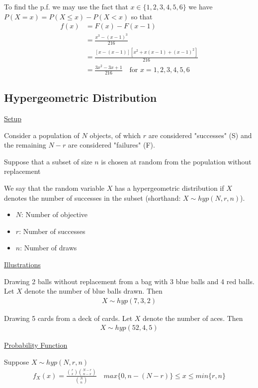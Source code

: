 \documentclass{article}
\begin{document}
To find the p.f. we may use the fact that $x \in \{1,2,3,4,5,6\}$ we have $P(X = x) = P(X \le x) - P(X < x)$ so that
\begin{align*}
    f(x) &= F(x) - F(x-1)\\
    &= \frac{x^3-(x-1)^3}{216}\\
    &=\frac{[x-(x-1)][x^2+x(x-1)+(x-1)^2]}{216}\\
    &=\frac{3x^2 - 3x + 1}{216} \quad \text{for } x = 1,2,3,4,5,6
\end{align*}

\subsection{Hypergeometric Distribution}

\underline{Setup}

Consider a population of $N$ objects, of which $r$ are considered "successes" (S) and the remaining $N-r$ are considered "failures" (F). 

Suppose that a subset of size $n$ is chosen at random from the population without replacement

We say that the random variable $X$ has a hypergeometric distribution if $X$ denotes the number of successes in the subset (shorthand: $X \sim hyp(N,r,n)$).
\begin{itemize}
    \item $N$: Number of objective
    \item $r$: Number of successes
    \item $n$: Number of draws
\end{itemize}

\underline{Illustrations}

Drawing 2 balls without replacement from a bag with 3 blue balls and 4 red balls. Let $X$ denote the number of blue balls drawn. Then
\begin{align*}
    X \sim hyp(7,3,2)
\end{align*}

Drawing 5 cards from a deck of cards. Let $X$ denote the number of aces. Then
\begin{align*}
    X \sim hyp(52,4,5)
\end{align*}

\underline{Probability Function}

Suppose $X \sim hyp(N,r,n)$
\begin{align*}
    f_X(x) = \frac{\binom{r}{x}\binom{N-r}{n-x}}{\binom{N}{n}} \quad max\{0,n-(N-r)\} \le x \le min\{r,n\}
\end{align*}
\end{document}
